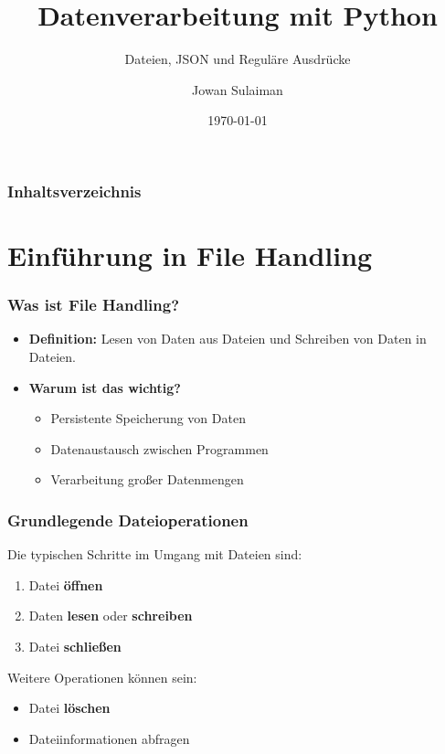 \documentclass[aspectratio=169]{beamer} %
\title{Datenverarbeitung mit Python}
\subtitle{Dateien, JSON und Reguläre Ausdrücke}
\author{Jowan Sulaiman}
\institute{\href{https://github.com/jowansulaiman/py-journey}{GitHub Repository: py-journey}}
\date{\today}
\begin{document}
\begin{frame}[plain] %
    \titlepage
\end{frame}

\begin{frame}[fragile]
\frametitle{Inhaltsverzeichnis}
\tableofcontents
\end{frame}

\section{Einführung in File Handling}

\begin{frame}[fragile]
\frametitle{Was ist File Handling?}
\begin{itemize}
    \item \textbf{Definition:} Lesen von Daten aus Dateien und Schreiben von Daten in Dateien.
    \item \textbf{Warum ist das wichtig?}
    \begin{itemize}
        \item Persistente Speicherung von Daten
        \item Datenaustausch zwischen Programmen
        \item Verarbeitung großer Datenmengen
    \end{itemize}
\end{itemize}
\end{frame}

\begin{frame}[fragile]
\frametitle{Grundlegende Dateioperationen}
Die typischen Schritte im Umgang mit Dateien sind:
\begin{enumerate}
    \item Datei \textbf{öffnen}
    \item Daten \textbf{lesen} oder \textbf{schreiben}
    \item Datei \textbf{schließen}
\end{enumerate}
\vspace{0.5cm}
Weitere Operationen können sein:
\begin{itemize}
    \item Datei \textbf{löschen}
    \item Dateiinformationen abfragen
\end{itemize}
\end{frame}
\end{document}
